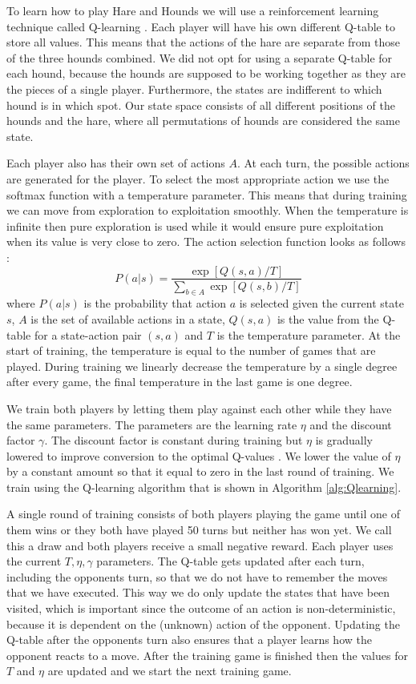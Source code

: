 To learn how to play Hare and Hounds we will use a reinforcement learning
technique called Q-learning \cite{watkins1992q}.
Each player will have his own different
Q-table to store all values. This means that the actions of the hare are
separate from those of the three hounds combined. We did not opt for using
a separate Q-table for each hound, because the hounds are supposed to be
working together as they are the pieces of a single player. Furthermore,
the states are indifferent to which hound is in which spot. Our state space
consists of all different positions of the hounds and the hare, where all
permutations of hounds are considered the same state.

Each player also has their own set of actions $A$. At each turn, the possible
actions are generated for the player. To select the most appropriate action we
use  the softmax function with a temperature parameter. This means that during
training we can move from exploration to exploitation smoothly. When the
temperature is infinite then pure exploration is used while it would ensure
pure exploitation when its value is very close to zero. The action selection
function looks as follows \cite{alpaydin}:
\begin{equation}
   P(a|s) = \frac{\exp[Q(s,a)/T]}{\displaystyle\sum_{b \in A} \exp[Q(s, b)/T]}
\end{equation}
where $P(a|s)$ is the probability that action $a$ is selected given the
current state $s$, $A$ is the set of available actions in a state, $Q(s,a)$ is
the value from the Q-table for a state-action pair $(s,a)$ and $T$ is the
temperature parameter. At the start of training, the temperature is equal to
the number of games that are played. During training we linearly decrease the
temperature by a single degree after every game, the final temperature in the
last game is one degree.

We train both players by letting them play against each other while they have
the same parameters. The parameters are the learning rate $\eta$ and the
discount factor $\gamma$. The discount factor is constant during training but
$\eta$ is gradually lowered to improve conversion to the optimal
Q-values \cite{alpaydin}. We lower the value of $\eta$ by a constant amount so
that it equal to zero in the last round of training. We train using the
Q-learning algorithm that is shown in Algorithm \autoref{alg:Qlearning}.

A single round of training consists of both players playing the game until
one of them wins or they both have played 50 turns but neither has won yet.
We call this a draw and both players receive a small negative reward. Each
player uses the current $T, \eta, \gamma$ parameters. The Q-table gets
updated after each turn, including the opponents turn, so that we do not
have to remember the moves that we have executed. This way we do only
update the states that have been visited, which is important since the
outcome of an action is non-deterministic, because it is dependent on the
(unknown) action of the opponent. Updating the Q-table after the opponents
turn also ensures that a player learns how the opponent reacts to a move.
After the training game is finished then the values for $T$ and $\eta$ are
updated and we start the next training game.

